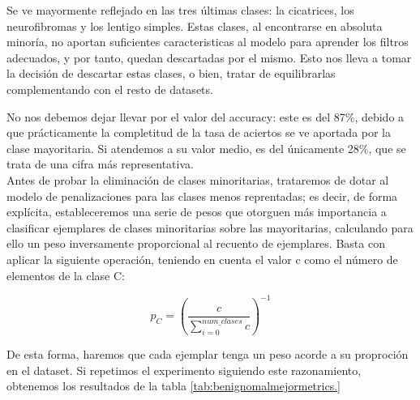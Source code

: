 Se ve mayormente reflejado en las tres últimas clases: la cicatrices, los neurofibromas y los lentigo simples. Estas clases, al encontrarse en absoluta minoría, no aportan suficientes caracteristicas al modelo para aprender los filtros adecuados, y por tanto, quedan descartadas por el mismo. Esto nos lleva a tomar la decisión de descartar estas clases, o bien, tratar de equilibrarlas complementando con el resto de datasets.

No nos debemos dejar llevar por el valor del accuracy: este es del 87\%, debido a que prácticamente la completitud de la tasa de aciertos se ve aportada por la clase mayoritaria. Si atendemos a su valor medio, es del únicamente 28\%, que se trata de una cifra más representativa.\\

Antes de probar la eliminación de clases minoritarias, trataremos de dotar al modelo de penalizaciones para las clases menos reprentadas; es decir, de forma explícita, estableceremos una serie de pesos que otorguen más importancia a clasificar ejemplares de clases minoritarias sobre las mayoritarias, calculando para ello un peso inversamente proporcional al recuento de ejemplares. Basta con aplicar la siguiente operación, teniendo en cuenta el valor c como el número de elementos de la clase C:

$$p_C =(\frac{c}{\sum_{i=0}^{num\_clases} c} )^{-1}$$

De esta forma, haremos que cada ejemplar tenga un peso acorde a su proproción en el dataset. Si repetimos el experimento siguiendo este razonamiento, obtenemos los resultados de la tabla \ref{tab:benignomalmejormetrics.}


